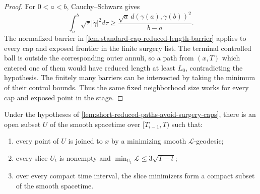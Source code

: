 \begin{proof}
For $0<a<b$, Cauchy--Schwarz gives
\[
 \int_a^b\sqrt\tau|\dot\gamma|^2d\tau
 \ge\frac{\sqrt a\,d(\gamma(a),\gamma(b))^2}{b-a}.
\]
The normalized barrier in
\ref{lem:standard-cap-reduced-length-barrier} applies to every cap and exposed
frontier in the finite surgery list.  The terminal controlled ball is outside
the corresponding outer annuli, so a path from $(x,T)$ which entered one of
them would have reduced length at least $L_0$, contradicting the hypothesis.
The finitely many barriers can be intersected by taking the minimum of their
control bounds.  Thus the same fixed neighborhood size works for every cap and
exposed point in the stage.
\end{proof}

\begin{proposition}
\label{prop:compact-reduced-minimizing-domain}
\notready
Under the hypotheses of \ref{lem:short-reduced-paths-avoid-surgery-caps},
there is an open subset $U$ of the smooth spacetime over
$[T_{i-1},T)$ such that:
\begin{enumerate}
\item every point of $U$ is joined to $x$ by a minimizing smooth
      $\mathcal L$-geodesic;
\item every slice $U_t$ is nonempty and
      $\min_{U_t}\mathcal L\le3\sqrt{T-t}$;
\item over every compact time interval, the slice minimizers form a compact
      subset of the smooth spacetime.
\end{enumerate}
\end{proposition}

